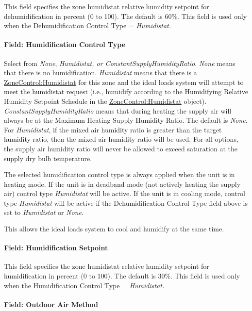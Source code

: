 This field specifies the zone humidistat relative humidity setpoint for dehumidification in percent (0 to 100). The default is 60\%. This field is used only when the Dehumidification Control Type = \emph{Humidistat.}

\paragraph{Field: Humidification Control Type}\label{field-humidification-control-type}

Select from \emph{None}, \emph{Humidistat, or ConstantSupplyHumidityRatio}. \emph{None} means that there is no humidification. \emph{Humidistat} means that there is a \hyperref[zonecontrolhumidistat]{ZoneControl:Humidistat} for this zone and the ideal loads system will attempt to meet the humidistat request (i.e., humidify according to the Humidifying Relative Humidity Setpoint Schedule in the \hyperref[zonecontrolhumidistat]{ZoneControl:Humidistat} object). \emph{ConstantSupplyHumidityRatio} means that during heating the supply air will always be at the Maximum Heating Supply Humidity Ratio. The default is \emph{None}. For \emph{Humidistat}, if the mixed air humidity ratio is greater than the target humidity ratio, then the mixed air humidity ratio will be used. For all options, the supply air humidity ratio will never be allowed to exceed saturation at the supply dry bulb temperature.

The selected humidification control type is always applied when the unit is in heating mode. If the unit is in deadband mode (not actively heating the supply air) control type \emph{Humidistat} will be active. If the unit is in cooling mode, control type \emph{Humidistat} will be active if the Dehumidification Control Type field above is set to \emph{Humidistat} or \emph{None}.

This allows the ideal loads system to cool and humidify at the same time.

\paragraph{Field: Humidification Setpoint}\label{field-humidification-setpoint}

This field specifies the zone humidistat relative humidity setpoint for humidification in percent (0 to 100). The default is 30\%. This field is used only when the Humidification Control Type = \emph{Humidistat.}

\paragraph{Field: Outdoor Air Method}\label{field-outdoor-air-method-000}

